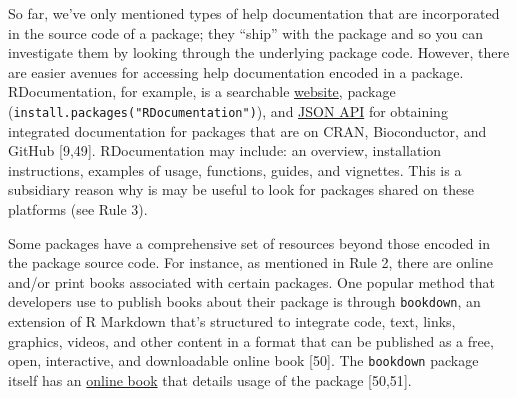 \documentclass[10pt,letterpaper]{article}
\begin{document}
So far, we've only mentioned types of help documentation that are
incorporated in the source code of a package; they ``ship'' with the
package and so you can investigate them by looking through the
underlying package code. However, there are easier avenues for accessing
help documentation encoded in a package. RDocumentation, for example, is
a searchable \href{https://www.rdocumentation.org/}{website}, package
(\texttt{install.packages("RDocumentation")}), and
\href{https://www.rdocumentation.org/docs/}{JSON API} for obtaining
integrated documentation for packages that are on CRAN, Bioconductor,
and GitHub {[}9,49{]}. RDocumentation may include: an overview,
installation instructions, examples of usage, functions, guides, and
vignettes. This is a subsidiary reason why is may be useful to look for
packages shared on these platforms (see Rule 3).

Some packages have a comprehensive set of resources beyond those encoded
in the package source code. For instance, as mentioned in Rule 2, there
are online and/or print books associated with certain packages. One
popular method that developers use to publish books about their package
is through \texttt{bookdown}, an extension of R Markdown that's
structured to integrate code, text, links, graphics, videos, and other
content in a format that can be published as a free, open, interactive,
and downloadable online book {[}50{]}. The \texttt{bookdown} package
itself has an \href{https://bookdown.org/yihui/bookdown/}{online book}
that details usage of the package {[}50,51{]}.
\end{document}
